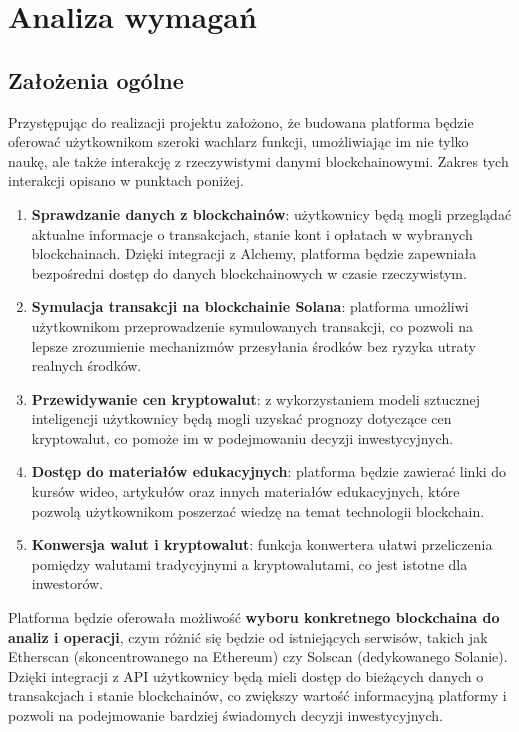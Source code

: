 \chapter{Analiza wymagań}
\section{Założenia ogólne}

Przystępując do realizacji projektu założono, że budowana platforma będzie oferować użytkownikom szeroki wachlarz funkcji, umożliwiając im nie tylko naukę, ale także interakcję z rzeczywistymi danymi blockchainowymi. Zakres tych interakcji opisano w punktach poniżej.
\begin{enumerate}[labelwidth=1em]
\item \textbf{Sprawdzanie danych z blockchainów}: użytkownicy będą mogli przeglądać aktualne informacje o transakcjach, stanie kont i opłatach w wybranych blockchainach. Dzięki integracji z Alchemy, platforma będzie zapewniała bezpośredni dostęp do danych blockchainowych w czasie rzeczywistym. 
\item \textbf{Symulacja transakcji na blockchainie Solana}: platforma umożliwi użytkownikom przeprowadzenie symulowanych transakcji, co pozwoli na lepsze zrozumienie mechanizmów przesyłania środków bez ryzyka utraty realnych środków. 
\item \textbf{Przewidywanie cen kryptowalut}: z wykorzystaniem modeli sztucznej inteligencji użytkownicy będą mogli uzyskać prognozy dotyczące cen kryptowalut, co pomoże im w podejmowaniu decyzji inwestycyjnych. 
\item \textbf{Dostęp do materiałów edukacyjnych}: platforma będzie zawierać linki do kursów wideo, artykułów oraz innych materiałów edukacyjnych, które pozwolą użytkownikom poszerzać wiedzę na temat technologii blockchain. 
\item \textbf{Konwersja walut i kryptowalut}: funkcja konwertera ułatwi przeliczenia pomiędzy walutami tradycyjnymi a kryptowalutami, co jest istotne dla inwestorów. 
\end{enumerate}

Platforma będzie oferowała możliwość \textbf{wyboru konkretnego blockchaina do analiz i operacji}, czym różnić się będzie od istniejących serwisów, takich jak Etherscan (skoncentrowanego na Ethereum) czy Solscan (dedykowanego Solanie). Dzięki integracji z API użytkownicy będą mieli dostęp do bieżących danych o transakcjach i stanie blockchainów, co zwiększy wartość informacyjną platformy i pozwoli na podejmowanie bardziej świadomych decyzji inwestycyjnych.


